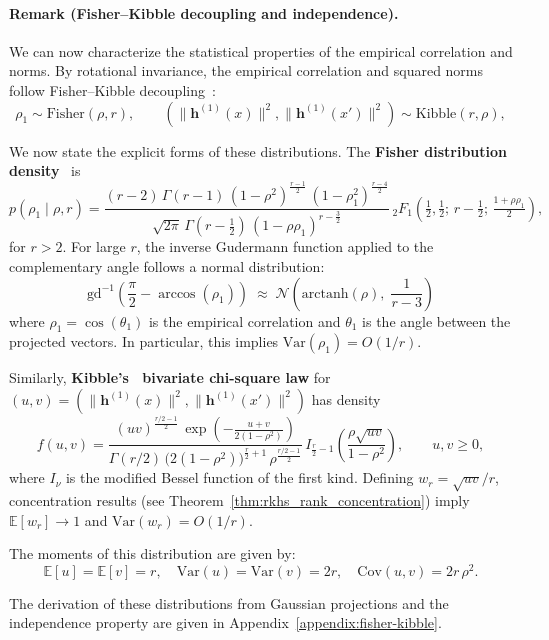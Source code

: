 \vspace{0.3cm}
\paragraph{Remark (Fisher–Kibble decoupling and independence).}
\label{rmk:fisher-kibble-law}
We can now characterize the statistical properties of the empirical correlation and norms. By rotational invariance, the empirical correlation and squared norms follow Fisher–Kibble decoupling~\cite{fisher1915probable,hotelling1953new}:
\[
\rho_1 \sim \text{Fisher}(\rho,r),\qquad (\|\bm{h}^{(1)}(x)\|^2,\|\bm{h}^{(1)}(x')\|^2)\sim \text{Kibble}(r,\rho),
\]
 

\vspace{0.2cm}
We now state the explicit forms of these distributions. The \textbf{Fisher distribution density}~\cite{fisher1915probable} is
\[
\boxed{p(\rho_1 \mid \rho, r) = \frac{(r-2)\,\Gamma(r-1)\,(1-\rho^2)^{\frac{r-1}{2}}\,(1-\rho_1^2)^{\frac{r-4}{2}}}{\sqrt{2\pi}\,\Gamma(r-\tfrac{1}{2})\,(1-\rho\rho_1)^{r-\frac{3}{2}}}\,{}_2F_1\!\left(\tfrac{1}{2},\tfrac{1}{2};\, r-\tfrac{1}{2};\, \tfrac{1+\rho\rho_1}{2}\right),}
\]
for \( r > 2 \). For large \( r \), the inverse Gudermann function applied to the complementary angle follows a normal distribution:
\[
\text{gd}^{-1}\!\left(\frac{\pi}{2} - \arccos(\rho_1)\right) \;\approx\; \mathcal{N}\!\left(\text{arctanh}(\rho),\; \frac{1}{r-3}\right)
\]
where \( \rho_1 = \cos(\theta_1) \) is the empirical correlation and \( \theta_1 \) is the angle between the projected vectors. In particular, this implies \( \text{Var}(\rho_1) = O(1/r) \).

\vspace{0.2cm}
Similarly, \textbf{Kibble's~\cite{kibble1941two} bivariate chi-square law} for \( (u,v) = (\|\bm{h}^{(1)}(x)\|^2, \|\bm{h}^{(1)}(x')\|^2) \) has density
\[
\boxed{f(u,v) = \frac{(uv)^{\frac{r/2-1}{2}}\,\exp\!\left(-\tfrac{u+v}{2(1-\rho^2)}\right)}{\Gamma(r/2)\,\big(2(1-\rho^2)\big)^{\frac{r}{2}+1}\,\rho^{\frac{r/2-1}{2}}}\, I_{\frac{r}{2}-1}\!\left(\frac{\rho\sqrt{uv}}{1-\rho^2}\right),\qquad u,v \ge 0,}
\]
where \( I_\nu \) is the modified Bessel function of the first kind. Defining \( w_r = \sqrt{uv}/r \), concentration results (see Theorem~\ref{thm:rkhs_rank_concentration}) imply \( \mathbb{E}[w_r] \to 1 \) and \( \mathrm{Var}(w_r)=O(1/r) \).

\vspace{0.15cm}
The moments of this distribution are given by:
\[
\mathbb{E}[u]=\mathbb{E}[v]=r,\quad \text{Var}(u)=\text{Var}(v)=2r,\quad \text{Cov}(u,v)=2r\,\rho^2.
\]
 
The derivation of these distributions from Gaussian projections and the independence property are given in Appendix~\ref{appendix:fisher-kibble}.
